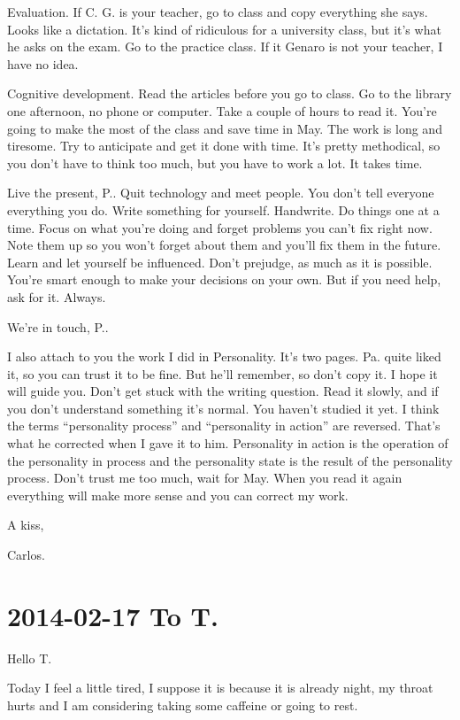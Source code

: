\documentclass[]{book}
\begin{document}
Evaluation. If C. G. is your teacher, go to class and copy everything she says. Looks like a dictation. It's kind of ridiculous for a university class, but it's what he asks on the exam. Go to the practice class. If it Genaro is not your teacher, I have no idea.

Cognitive development. Read the articles before you go to class. Go to the library one afternoon, no phone or computer. Take a couple of hours to read it. You're going to make the most of the class and save time in May. The work is long and tiresome. Try to anticipate and get it done with time. It's pretty methodical, so you don't have to think too much, but you have to work a lot. It takes time.

Live the present, P.. Quit technology and meet people. You don't tell everyone everything you do. Write something for yourself. Handwrite. Do things one at a time. Focus on what you're doing and forget problems you can't fix right now. Note them up so you won't forget about them and you'll fix them in the future. Learn and let yourself be influenced. Don't prejudge, as much as it is possible. You're smart enough to make your decisions on your own. But if you need help, ask for it. Always.

We're in touch, P..

I also attach to you the work I did in Personality. It's two pages. Pa. quite liked it, so you can trust it to be fine. But he'll remember, so don't copy it. I hope it will guide you. Don't get stuck with the writing question. Read it slowly, and if you don't understand something it's normal. You haven't studied it yet. I think the terms ``personality process'' and ``personality in action'' are reversed. That's what he corrected when I gave it to him. Personality in action is the operation of the personality in process and the personality state is the result of the personality process. Don't trust me too much, wait for May. When you read it again everything will make more sense and you can correct my work.

A kiss,

Carlos.

\hypertarget{tot20140217}{%
\section*{2014-02-17 To T.}\label{tot20140217}}

Hello T.

Today I feel a little tired, I suppose it is because it is already night, my throat hurts and I am considering taking some caffeine or going to rest.
\end{document}
